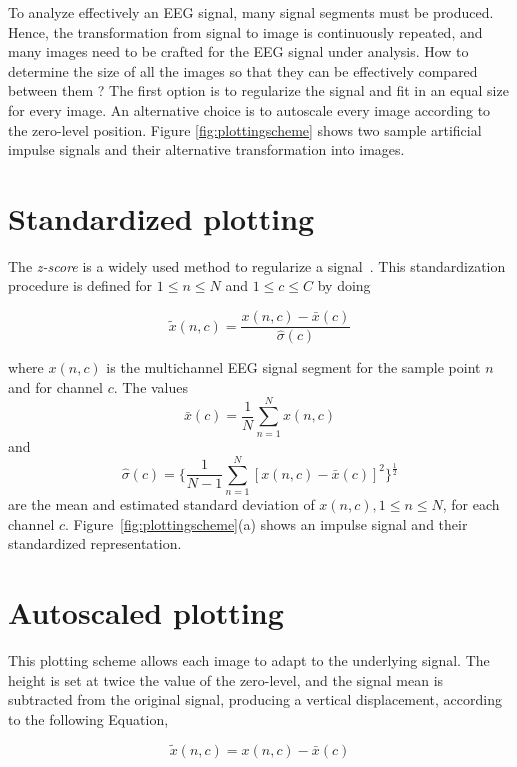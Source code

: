 To analyze effectively an EEG signal, many signal segments must be produced.  Hence, the transformation from signal to image is continuously repeated, and many images need to be crafted for the EEG signal under analysis.  How to determine the size of all the images so that they can be effectively compared between them ?  The first option is to regularize the signal and fit in an equal size for every image.  An alternative choice is to autoscale every image according to the zero-level position.  Figure \ref{fig:plottingscheme} shows two sample artificial impulse signals and their  alternative transformation into images.

\section{Standardized plotting}
\label{standardized}

The \textit{z-score} is a widely used method to regularize a signal~\cite{Zhang2013}. This standardization procedure is defined for  $1 \leq n \leq N$ and $1 \leq c \leq C$ by doing

\begin{equation}
\tilde{x}(n,c) =  \frac{ x(n,c) - \bar{x}(c) }{ \hat{\sigma}(c) } 
\label{eq:standarizedaverages}
\end{equation}

\noindent  where $ x(n,c) $ is the multichannel EEG signal segment for the sample point $n$ and for channel $c$. The values $$\bar{x}(c) =\frac{1}{N}\sum_{n=1}^{N}x(n,c)$$ and $$ \hat{\sigma}(c) =   \bigg \{ \frac{1}{N-1}\sum_{n=1}^{N} { \left[ x(n,c)-\bar{x}(c) \right]  }^2 \bigg \}^{\frac{1}{2}}$$ are the mean and estimated standard deviation of $x(n,c), 1 \leq n \leq N$, for each channel $c$. Figure~\ref{fig:plottingscheme}(a) shows an impulse signal and their standardized representation.

\section{Autoscaled plotting}
\label{autoscaled}

This plotting scheme allows each image to adapt to the underlying signal.  The height is set at twice the value of the zero-level, and the signal mean is subtracted from the original signal, producing a vertical displacement, according to the following Equation,

\begin{equation}
\tilde{x}(n,c) =  x(n,c) - \bar{x}(c) 
\label{eq:autoscaled}
\end{equation}

